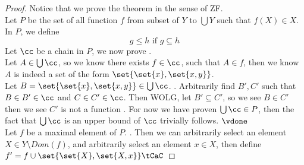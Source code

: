 \documentclass{report}
\begin{document}
\begin{proof}
Notice that we prove the theorem in the sense of ZF.\\

  Let $P$ be the set of all function $f$ from subset of  $Y$ to  $\bigcup Y$ such that $f(X)\in X$. In $P$, we define
\begin{equation*}
g\leq h\text{ if }g\subseteq h
\end{equation*}
Let $\cc$ be a chain in $P$, we  now prove .\\

Let $A \in \bigcup \cc$, so we know there exists $f \in \cc$, such that $A\in f$, then we know $A$ is indeed a set of the form  $\set{\set{x},\set{x,y}}$.\\

Let $B=\set{\set{x},\set{x,y}}\in \bigcup \cc$. . Arbitrarily find $B',C'$ such that  $B\in B' \in \cc$ and $C \in C'\in \cc$. Then WOLG, let $B'\subseteq C'$, so we see $B\in C'$ then we see $C'$ is not a function  \CaC. For now we have proven $\bigcup \cc \in P$, then the fact that $\bigcup \cc$ is an upper bound of $\cc$ trivially follows. $\vdone$ \\

Let $f$ be a maximal element of  $P$. . Then we can arbitrarily select an element $X\in Y\setminus Dom(f)$, and arbitrarily select an element $x\in X$, then define $f'=f\cup \set{\set{X},\set{X,x}}\tCaC$
\end{proof}
\end{document}
